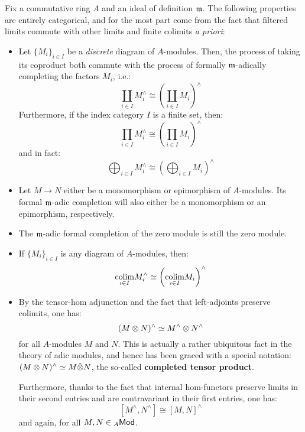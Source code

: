                \begin{remark} \label{remark: basic_properties_of_formal_completions}
                    Fix a commutative ring $A$ and an ideal of definition $\mathfrak{m}$. The following properties are entirely categorical, and for the most part come from the fact that filtered limits commute with other limits and finite colimits \textit{a priori}:
                        \begin{itemize}
                            \item Let $\{M_i\}_{i \in I}$ be a \textit{discrete} diagram of $A$-modules. Then, the process of taking its coproduct both commute with the process of formally $\mathfrak{m}$-adically completing the factors $M_i$, i.e.:
                                $$\coprod_{i \in I} M_i^{\wedge} \cong \left(\coprod_{i \in I} M_i\right)^{\wedge}$$
                            Furthermore, if the index category $I$ is a finite set, then:
                                $$\prod_{i \in I} M_i^{\wedge} \cong \left(\prod_{i \in I} M_i\right)^{\wedge}$$
                            and in fact:
                                $$\bigoplus_{i \in I} M_i^{\wedge} \cong \left(\bigoplus_{i \in I} M_i\right)^{\wedge}$$  
                            \item Let $M \to N$ either be a monomorphism or epimorphism of $A$-modules. Its formal $\mathfrak{m}$-adic completion will also either be a monomorphism or an epimorphism, respectively.
                            \item The $\mathfrak{m}$-adic formal completion of the zero module is still the zero module.
                            \item If $\{M_i\}_{i \in I}$ is any diagram of $A$-modules, then:
                                $$\underset{i \in I}{\operatorname{colim}} M_i^{\wedge} \simeq \left(\underset{i \in I}{\operatorname{colim}} M_i\right)^{\wedge}$$
                            \item By the tensor-hom adjunction and the fact that left-adjoints preserve colimits, one has:
                                $$(M \tensor N)^{\wedge} \cong M^{\wedge} \tensor N^{\wedge}$$
                            for all $A$-modules $M$ and $N$. This is actually a rather ubiquitous fact in the theory of adic modules, and hence has been graced with a special notation: $(M \tensor N)^{\wedge} \cong M \hat{\tensor} N$, the so-called \textbf{completed tensor product}.
                            
                            Furthermore, thanks to the fact that internal hom-functors preserve limits in their second entries and are contravariant in their first entries, one has:
                                $$[M^{\wedge}, N^{\wedge}] \cong [M, N]^{\wedge}$$
                            and again, for all $M, N \in {}_A\mathsf{Mod}$.
                        \end{itemize}
                \end{remark}
                
